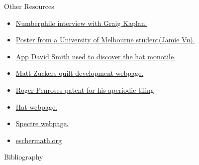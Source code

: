 \documentclass{beamer}
\begin{document}
\begin{frame}[allowframebreaks]{Other Resources}
    \begin{itemize}
        \item \href{https://www.youtube.com/watch?v=_ZS3Oqg1AX0&ab_channel=Numberphile}{Numberphile interview with Graig Kaplan.}
        \item \href{https://ms.unimelb.edu.au/__data/assets/pdf_file/0011/5218382/vujamie_296128_22162633_Jamie_Vu_Poster_final.pdf}{Poster from a University of Melbourne student(Jamie Vu).}
        \item \href{https://cs.uwaterloo.ca/~csk/spectre/app.html}{App David Smith used to discover the hat monotile.}
        \item \href{https://mzucker.github.io/2022/11/13/penrose-tiling-quilt.html}{Matt Zuckers quilt development webpage.}
        \item \href{https://patentimages.storage.googleapis.com/f2/9b/08/1b79cb4e4c0f3f/US4133152.pdf}{Roger Penroses patent for his aperiodic tiling}
        \item \href{https://cs.uwaterloo.ca/~csk/hat/}{Hat webpage.}
        \item \href{https://cs.uwaterloo.ca/~csk/spectre/}{Spectre webpage.}
        \item \href{https://eschermath.org/wiki/Wallpaper_Patterns.html}{eschermath.org}
    \end{itemize}
\end{frame}

    

\begin{frame}[allowframebreaks]{Bibliography}
  \footnotesize
  
  
\end{frame}





\end{document}
